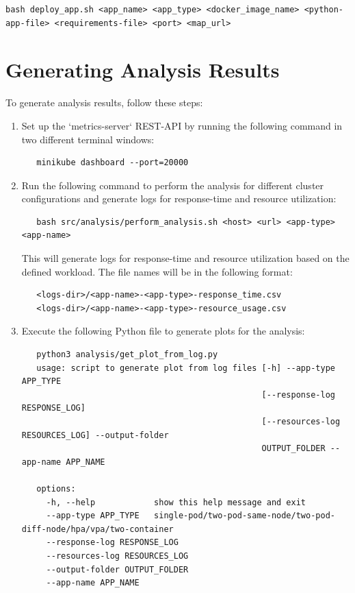 \documentclass{article}
\begin{document}

\begin{verbatim}
bash deploy_app.sh <app_name> <app_type> <docker_image_name> <python-app-file> <requirements-file> <port> <map_url>
\end{verbatim}

\section{Generating Analysis Results}
To generate analysis results, follow these steps:

\begin{enumerate}
   \item Set up the `metrics-server` REST-API by running the following command in two different terminal windows:
   
   \begin{verbatim}
   minikube dashboard --port=20000
   \end{verbatim}
   
   \item Run the following command to perform the analysis for different cluster configurations and generate logs for response-time and resource utilization:
   
   \begin{verbatim}
   bash src/analysis/perform_analysis.sh <host> <url> <app-type> <app-name>
   \end{verbatim}
   
   This will generate logs for response-time and resource utilization based on the defined workload. The file names will be in the following format:
   
   \begin{verbatim}
   <logs-dir>/<app-name>-<app-type>-response_time.csv
   <logs-dir>/<app-name>-<app-type>-resource_usage.csv
   \end{verbatim}
   
   \item Execute the following Python file to generate plots for the analysis:
   
   \begin{verbatim}
   python3 analysis/get_plot_from_log.py
   usage: script to generate plot from log files [-h] --app-type APP_TYPE
                                                 [--response-log RESPONSE_LOG]
                                                 [--resources-log RESOURCES_LOG] --output-folder
                                                 OUTPUT_FOLDER --app-name APP_NAME

   options:
     -h, --help            show this help message and exit
     --app-type APP_TYPE   single-pod/two-pod-same-node/two-pod-diff-node/hpa/vpa/two-container
     --response-log RESPONSE_LOG
     --resources-log RESOURCES_LOG
     --output-folder OUTPUT_FOLDER
     --app-name APP_NAME
   \end{verbatim}
\end{enumerate}
\end{document}
